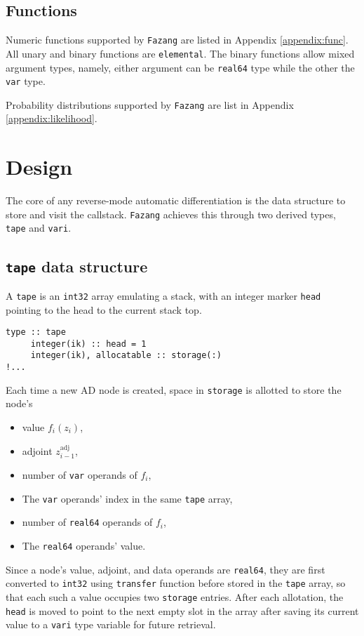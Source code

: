\documentclass[12pt, reqno, oneside]{amsbook}
\numberwithin{equation}{chapter}
\begin{document}
\section{Functions}
\label{sec:orgf7931eb}
Numeric functions supported by \texttt{Fazang} are listed in Appendix \ref{appendix:func}. All unary and
binary functions are \texttt{elemental}. The binary functions allow mixed
argument types, namely, either argument can be \texttt{real64} type while the
other the \texttt{var} type.

Probability distributions supported by \texttt{Fazang} are list in Appendix \ref{appendix:likelihood}.

\chapter{Design}
\label{sec:org5e93332}
The core of any reverse-mode automatic differentiation is the data
structure to store and visit the callstack. \texttt{Fazang} achieves this
through two derived types, \texttt{tape} and \texttt{vari}.

\section{\texttt{tape} data structure}
\label{sec:org20e7ecd}
A \texttt{tape} is an \texttt{int32} array emulating a stack, with an integer marker \texttt{head} pointing to the
head to the current stack top.
\begin{verbatim}
type :: tape
     integer(ik) :: head = 1
     integer(ik), allocatable :: storage(:)
!...
\end{verbatim}
Each time a new AD node is created,
space in \texttt{storage} is allotted to store the node's
\begin{itemize}
\item value \(f_i(z_i)\),
\item adjoint \(z_{i-1}^{\text{adj}}\),
\item number of \texttt{var} operands of \(f_i\),
\item The \texttt{var} operands' index in the same \texttt{tape} array,
\item number of \texttt{real64} operands of \(f_i\),
\item The \texttt{real64} operands' value.
\end{itemize}

Since a node's value, adjoint, and data
operands are \texttt{real64}, they are first converted to \texttt{int32} using
\texttt{transfer} function before stored in the \texttt{tape} array, so that each such
a value occupies two \texttt{storage} entries. After each
allotation, the \texttt{head} is moved to point to the next empty slot in
the array after saving its current value to a \texttt{vari} type variable
for future retrieval.
\end{document}
